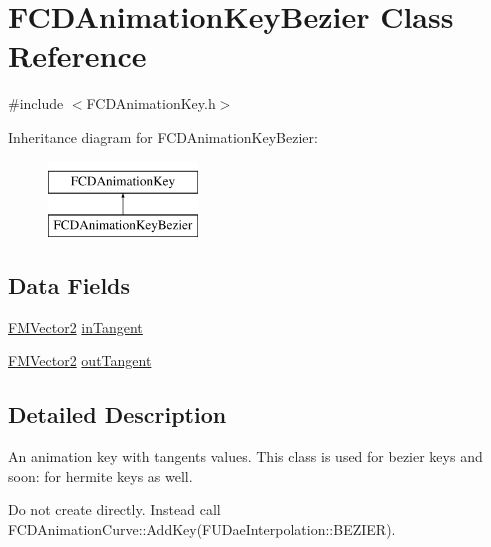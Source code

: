 \hypertarget{classFCDAnimationKeyBezier}{
\section{FCDAnimationKeyBezier Class Reference}
\label{classFCDAnimationKeyBezier}
}


{\ttfamily \#include $<$FCDAnimationKey.h$>$}

Inheritance diagram for FCDAnimationKeyBezier:\begin{figure}[H]
\begin{center}
\leavevmode
\includegraphics[height=2.000000cm]{classFCDAnimationKeyBezier}
\end{center}
\end{figure}
\subsection*{Data Fields}
\begin{DoxyCompactItemize}
\item 
\hyperlink{classFMVector2}{FMVector2} \hyperlink{classFCDAnimationKeyBezier_a9376d6dde01d5a78629935b1bebf1ac1}{inTangent}
\item 
\hyperlink{classFMVector2}{FMVector2} \hyperlink{classFCDAnimationKeyBezier_a46baf873490cd046c4b54ea4f8926bf7}{outTangent}
\end{DoxyCompactItemize}


\subsection{Detailed Description}
An animation key with tangents values. This class is used for bezier keys and soon: for hermite keys as well.

Do not create directly. Instead call FCDAnimationCurve::AddKey(FUDaeInterpolation::BEZIER). 

